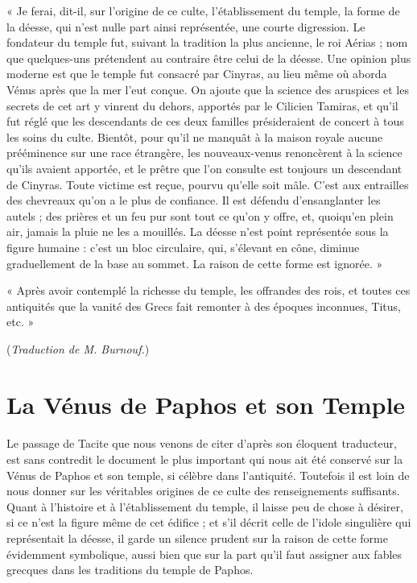 \documentclass[a4paper, 11pt, oneside, polutonikogreek, french]{article}
\begin{document}
« Je ferai, dit-il, sur l'origine de ce culte, l'établissement du temple, la forme de la déesse, qui n'est nulle part ainsi représentée, une courte digression. Le fondateur du temple fut, suivant la tradition la plus ancienne, le roi Aérias ; nom que quelques-uns prétendent au contraire être celui de la déesse. Une opinion plus moderne est que le temple fut consacré par Cinyras, au lieu même où aborda Vénus après que la mer l'eut conçue. On ajoute que la science des aruspices et les secrets de cet art y vinrent du dehors, apportés par le Cilicien Tamiras, et qu'il fut réglé que les descendants de ces deux familles présideraient de concert à tous les soins du culte. Bientôt, pour qu'il ne manquât à la maison royale aucune prééminence sur une race étrangère, les nouveaux-venus renoncèrent à la science qu'ils avaient apportée, et le prêtre que l'on consulte est toujours un descendant de Cinyras. Toute victime est reçue, pourvu qu'elle soit mâle. C'est aux entrailles des chevreaux qu'on a le plus de confiance. Il est défendu d'ensanglanter les autels ; des prières et un feu pur sont tout ce qu'on y offre, et, quoiqu'en plein air, jamais la pluie ne les a mouillés. La déesse n'est point représentée sous la figure humaine : c'est un bloc circulaire, qui, s'élevant en cône, diminue graduellement de la base au sommet. La raison de cette forme est ignorée. »

« Après avoir contemplé la richesse du temple, les offrandes des rois, et toutes ces antiquités que la vanité des Grecs fait remonter à des époques inconnues, Titus, etc. »

\bigskip

(\emph{Traduction de M. Burnouf.})
\clearpage
\section*{La Vénus de Paphos et son Temple}
\paragraph{}
Le passage de Tacite que nous venons de citer d'après son éloquent traducteur, est sans contredit le document le plus important qui nous ait été conservé sur la Vénus de Paphos et son temple, si célèbre dans l'antiquité. Toutefois il est loin de nous donner sur les véritables origines de ce culte des renseignements suffisants. Quant à l'histoire et à l'établissement du temple, il laisse peu de chose à désirer, si ce n'est la figure même de cet édifice ; et s'il décrit celle de l'idole singulière qui représentait la déesse, il garde un silence prudent sur la raison de cette forme évidemment symbolique, aussi bien que sur la part qu'il faut assigner aux fables grecques dans les traditions du temple de Paphos.
\end{document}
